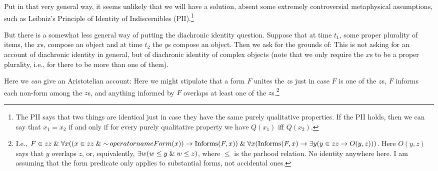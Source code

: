 Put in that very general way, it seems unlikely that we will have a solution, 
absent some extremely controversial metaphysical assumptions, such as 
Leibniz's Principle of Identity of Indiscernibles (PII).\footnote{The PII says
that two things are identical just in case they have the same purely qualitative
properties. If the PII holds, then we can say that $x_1=x_2$ if and only if 
for every purely qualitative property we have $Q(x_1)$ iff $Q(x_2)$.} 

But there is a somewhat less general way of putting the diachronic identity question.
Suppose that at time $t_1$, some proper plurality of items, the $x$s, compose an 
object and at time $t_2$ the $y$s compose an object. Then we ask for the grounds of:
This is not asking for an account of diachronic identity in general, but of diachronic
identity of complex objects (note that we only require the $x$s to be a proper
plurality, i.e., for there to be more than one of them).
    
Here we \textit{can} give an Aristotelian account:
Here we might stipulate that a form $F$ unites the $z$s just in case $F$ is one of 
the $z$s, $F$ informs each non-form among the $z$s, and anything informed 
by $F$ overlaps at least one of the $z$s.\footnote{I.e., 
$F\in zz\mathrel{\&} \forall x((x \in zz \mathrel{\&}\operatorname{\sim} operatorname{Form}(x)) \rightarrow 
\operatorname{Informs}(F,x))\mathrel{\&}\forall x(\operatorname{Informs}(F,x)\rightarrow
\exists y(y\in zz \rightarrow O(y,z)))$. Here $O(y,z)$ says that $y$ overlaps $z$,
or, equivalently, $\exists w(w\le y\mathrel{\&} w\le z)$, where $\le$ is the parhood
relation. No identity anywhere here. I am assuming that the form predicate
only applies to substantial forms, not accidental ones.}

